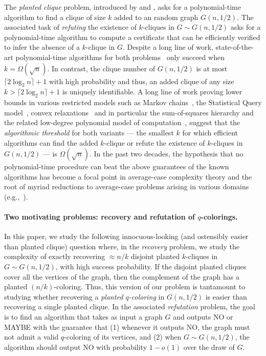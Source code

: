 \documentclass{article}
\begin{document}
The \emph{planted clique} problem, introduced by \cite{Jerrum} and \cite{kucera}, asks for a polynomial-time algorithm to find a clique of size $k$ added to an \ER random graph $G(n,1/2)$. The associated task of \emph{refuting} the existence of $k$-cliques in $G \sim G(n,1/2)$ asks for a polynomial-time algorithm to compute a certificate that can be efficiently verified to infer the absence of a $k$-clique in $G$. Despite a long line of work, state-of-the-art polynomial-time algorithms for both problems~\cite{AKS98} only succeed when $k = \Omega(\sqrt{n})$. In contrast, the clique number of $G(n,1/2)$ is at most $ \lceil 2 \log_2 n \rceil+1$ with high probability and thus, an added clique of any size $k > \lceil 2 \log_2 n \rceil+1 $ is uniquely identifiable. A long line of work proving lower bounds in various restricted models such as Markov chains~\cite{Jerrum}, the Statistical Query model~\cite{sq-clique}, convex relaxations~\cite{FeigeK03} and in particular the sum-of-squares hierarchy and the related low-degree polynomial model of computation~\cite{BHKK+16,hopkins-thesis}, suggest that the \emph{algorithmic threshold} for both variants --- the smallest $k$ for which efficient algorithms can find the added $k$-clique or refute the existence of $k$-cliques in $G(n,1/2)$ --- is $\Omega(\sqrt{n})$. In the past two decades, the hypothesis that no polynomial-time procedure can beat the above guarantees of the known algorithms has become a focal point in average-case complexity theory and the root of myriad reductions to average-case problems arising in various domains (e.g.,~\cite{BR-reduction,HWX-reductions,BBH-reductions,hardness-of-Nash-welfare}).


\paragraph{Two motivating problems: recovery and refutation of $q$-colorings.}

In this paper, we study the following innocuous-looking (and ostensibly easier than planted clique) question where, in the \emph{recovery} problem, we study the complexity of exactly recovering $\approx n/k$ disjoint planted $k$-cliques in $G \sim G(n,1/2)$, with high success probability. If the disjoint planted cliques cover all the vertices of the graph, then the complement of the graph has a planted $(n/k)$-coloring. Thus, this version of our problem is tantamount to studying whether recovering a {\em planted $q$-coloring} in $G(n,1/2)$ is easier than recovering a single planted clique. In the associated \emph{refutation} problem, the goal is to find an algorithm that takes as input a graph $G$ and outputs NO or MAYBE with the guarantee that (1) whenever it outputs NO, the graph must not admit a valid $q$-coloring of its vertices, and (2) when $G \sim G(n,1/2)$, the algorithm should output NO with probability $1-o(1)$ over the draw of $G$.
\end{document}
